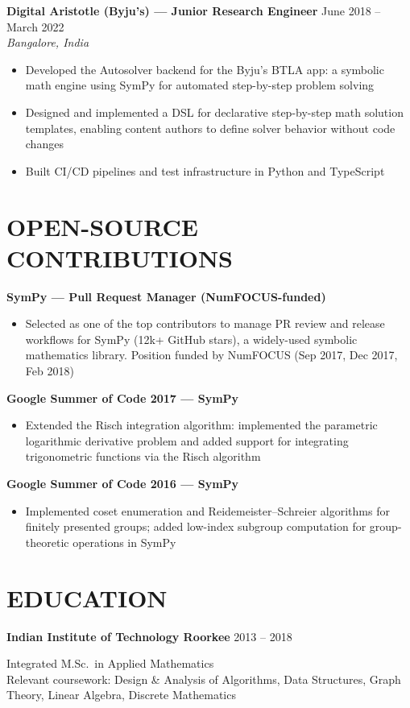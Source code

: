 \documentclass[11pt, a4paper]{article}
\newcommand{\role}[3]{%
    \vspace{0.4em}
    \noindent\textbf{#1} \hfill \textcolor{muted}{\small #3}\\[-0.3em]
    \textit{\textcolor{muted}{\small #2}}
    \vspace{0.1em}
}
\newcommand{\ossproject}[1]{%
    \vspace{0.3em}\noindent\textbf{\small #1}
    \vspace{0.05em}
}
\begin{document}
\role{Digital Aristotle (Byju's) --- Junior Research Engineer}{Bangalore, India}{June 2018 -- March 2022}
\begin{itemize}
    \item Developed the Autosolver backend for the Byju's BTLA app: a symbolic math engine using SymPy for automated step-by-step problem solving
    \item Designed and implemented a DSL for declarative step-by-step math solution templates, enabling content authors to define solver behavior without code changes
    \item Built CI/CD pipelines and test infrastructure in Python and TypeScript
\end{itemize}

\section{OPEN-SOURCE CONTRIBUTIONS}

\ossproject{SymPy --- Pull Request Manager (NumFOCUS-funded)}
\begin{itemize}
    \item Selected as one of the top contributors to manage PR review and release workflows for SymPy (12k+ GitHub stars), a widely-used symbolic mathematics library. Position funded by NumFOCUS (Sep 2017, Dec 2017, Feb 2018)
\end{itemize}

\ossproject{Google Summer of Code 2017 --- SymPy}
\begin{itemize}
    \item Extended the Risch integration algorithm: implemented the parametric logarithmic derivative problem and added support for integrating trigonometric functions via the Risch algorithm
\end{itemize}

\ossproject{Google Summer of Code 2016 --- SymPy}
\begin{itemize}
    \item Implemented coset enumeration and Reidemeister--Schreier algorithms for finitely presented groups; added low-index subgroup computation for group-theoretic operations in SymPy
\end{itemize}

\section{EDUCATION}

\role{Indian Institute of Technology Roorkee}{}{2013 -- 2018}
Integrated M.Sc.\ in Applied Mathematics\\
{\small\textcolor{muted}{Relevant coursework: Design \& Analysis of Algorithms, Data Structures, Graph Theory, Linear Algebra, Discrete Mathematics}}
\end{document}
